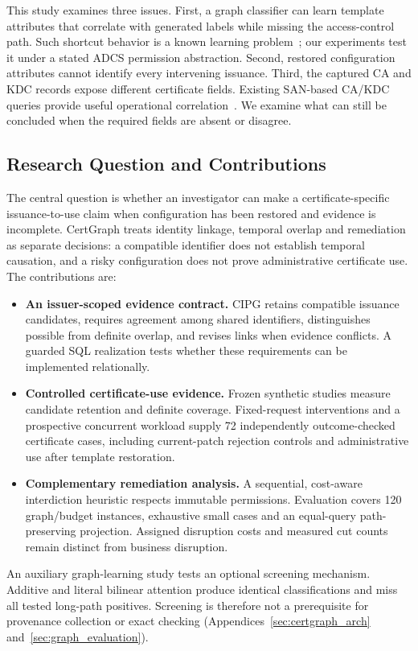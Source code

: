 This study examines three issues. First, a graph classifier can learn template attributes that correlate with generated labels while missing the access-control path. Such shortcut behavior is a known learning problem~\cite{geirhos2020shortcut}; our experiments test it under a stated ADCS permission abstraction. Second, restored configuration attributes cannot identify every intervening issuance. Third, the captured CA and KDC records expose different certificate fields. Existing SAN-based CA/KDC queries provide useful operational correlation~\cite{insecurity2023adcs,splunk2026esc1}. We examine what can still be concluded when the required fields are absent or disagree.

\subsection{Research Question and Contributions}
The central question is whether an investigator can make a certificate-specific issuance-to-use claim when configuration has been restored and evidence is incomplete. CertGraph treats identity linkage, temporal overlap and remediation as separate decisions: a compatible identifier does not establish temporal causation, and a risky configuration does not prove administrative certificate use. The contributions are:
\begin{itemize}
\item \textbf{An issuer-scoped evidence contract.} CIPG retains compatible issuance candidates, requires agreement among shared identifiers, distinguishes possible from definite overlap, and revises links when evidence conflicts. A guarded SQL realization tests whether these requirements can be implemented relationally.
\item \textbf{Controlled certificate-use evidence.} Frozen synthetic studies measure candidate retention and definite coverage. Fixed-request interventions and a prospective concurrent workload supply 72 independently outcome-checked certificate cases, including current-patch rejection controls and administrative use after template restoration.
\item \textbf{Complementary remediation analysis.} A sequential, cost-aware interdiction heuristic respects immutable permissions. Evaluation covers 120 graph/budget instances, exhaustive small cases and an equal-query path-preserving projection. Assigned disruption costs and measured cut counts remain distinct from business disruption.
\end{itemize}
An auxiliary graph-learning study tests an optional screening mechanism. Additive and literal bilinear attention produce identical classifications and miss all tested long-path positives. Screening is therefore not a prerequisite for provenance collection or exact checking (Appendices~\ref{sec:certgraph_arch} and~\ref{sec:graph_evaluation}).

